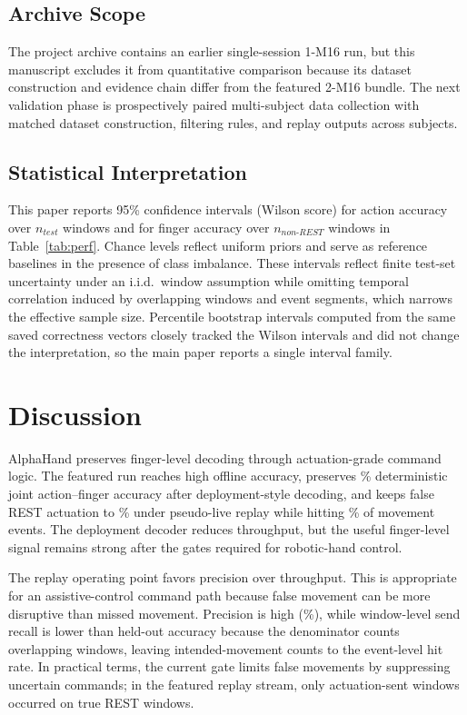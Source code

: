 \documentclass[conference]{IEEEtran}
\begin{document}
\subsection{Archive Scope}
The project archive contains an earlier single-session 1-M16 run, but this manuscript excludes it from quantitative comparison because its dataset construction and evidence chain differ from the featured 2-M16 bundle. The next validation phase is prospectively paired multi-subject data collection with matched dataset construction, filtering rules, and replay outputs across subjects.

\subsection{Statistical Interpretation}
This paper reports 95\% confidence intervals (Wilson score) \cite{Wilson1927Inference} for action accuracy over $n_{test}$ windows and for finger accuracy over $n_{non\text{-}REST}$ windows in Table~\ref{tab:perf}. Chance levels reflect uniform priors and serve as reference baselines in the presence of class imbalance. These intervals reflect finite test-set uncertainty under an i.i.d.\ window assumption while omitting temporal correlation induced by overlapping windows and event segments, which narrows the effective sample size. Percentile bootstrap intervals computed from the same saved correctness vectors closely tracked the Wilson intervals and did not change the interpretation, so the main paper reports a single interval family.

\section{Discussion}
\label{sec:discussion}
AlphaHand preserves finger-level decoding through actuation-grade command logic. The featured run reaches high offline accuracy, preserves \FeaturedJointAcc\% deterministic joint action--finger accuracy after deployment-style decoding, and keeps false REST actuation to \FeaturedFalseActuationRateRest\% under pseudo-live replay while hitting \FeaturedReplayEventHitRate\% of movement events. The deployment decoder reduces throughput, but the useful finger-level signal remains strong after the gates required for robotic-hand control.

The replay operating point favors precision over throughput. This is appropriate for an assistive-control command path because false movement can be more disruptive than missed movement. Precision is high (\FeaturedReplayPrecision\%), while window-level send recall is lower than held-out accuracy because the denominator counts overlapping windows, leaving intended-movement counts to the event-level hit rate. In practical terms, the current gate limits false movements by suppressing uncertain commands; in the featured replay stream, only \FeaturedReplayFalseActuationCount{} actuation-sent windows occurred on \FeaturedReplayRestWindows{} true REST windows.
\end{document}
